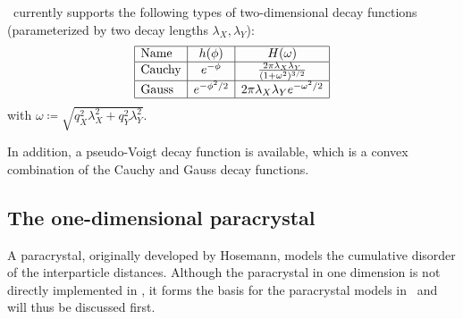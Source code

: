 \BornAgain\ currently supports the following types of two-dimensional decay functions
(parameterized by two decay lengths $\lambda_X, \lambda_Y$):
\begin{equation}
  \begin{array}{|l|c|c|}
    \hline
    \text{Name} & h(\phi) & H(\omega) \\
    \hline
    \text{Cauchy} & e^{-\phi} & \frac{2\pi\lambda_X\lambda_Y}{(1+\omega^2)^{3/2}} \\
    \hline
    \text{Gauss} & e^{-\phi^2/2} & 2\pi\lambda_X\lambda_Y e^{-\omega^2/2} \\
    \hline
  \end{array}
\end{equation}
with $\omega \coloneqq \sqrt{q_X^2\lambda_X^2 + q_Y^2\lambda_Y^2}$.

In addition, a pseudo-Voigt decay function is available, which is a convex combination of the Cauchy and Gauss decay functions.

\subsection{The one-dimensional paracrystal} \label{sec:sect:1dparacrystal}
A paracrystal, originally developed by Hosemann\cite{Hos51}, models the cumulative disorder of
the interparticle distances. Although the paracrystal in one dimension is not directly implemented in \BornAgain, it forms the
basis for the paracrystal models in \BornAgain\ and will thus be discussed first.

